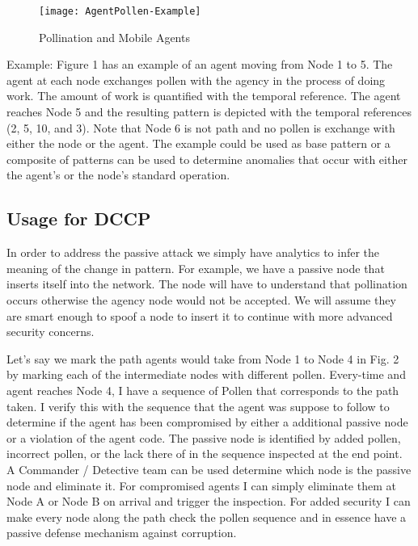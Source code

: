 \documentclass{acm_proc_article-sp}
\begin{document}
\begin{figure}
\centering
\texttt{[image: AgentPollen-Example]}
\caption{Pollination and Mobile Agents}
\end{figure}

Example: Figure 1 has an example of an agent moving from Node 1 to 5. The agent at each node exchanges pollen with the agency in the process of doing work. The amount of work is quantified with the temporal reference. The agent reaches Node 5 and the resulting pattern is depicted with the temporal references (2, 5, 10, and 3). Note that Node 6 is not path and no pollen is exchange with either the node or the agent. The example could be used as base pattern or a composite of patterns can be used to determine anomalies that occur with either the agent's or the node's standard operation.  

\subsection{Usage for DCCP}
In order to address the passive attack we simply have analytics to infer the meaning of the change in pattern. For example, we have a passive node that inserts itself into the network. The node will have to understand that pollination occurs otherwise the agency node would not be accepted. We will assume they are smart enough to spoof a node to insert it to continue with more advanced security concerns.  

Let’s say we mark the path agents would take from Node 1 to Node 4 in Fig. 2 by marking each of the intermediate nodes with different pollen.  Every-time and agent reaches Node 4, I have a sequence of Pollen that corresponds to the path taken. I verify this with the sequence that the agent was suppose to follow to determine if the agent has been compromised by either a additional passive node or a violation of the agent code. The passive node is identified by added pollen, incorrect pollen, or the lack there of in the sequence inspected at the end point. A Commander / Detective team can be used determine which node is the passive node and eliminate it. For compromised agents I can simply eliminate them at Node A or Node B on arrival and trigger the inspection. For added security I can make every node along the path check the pollen sequence and in essence have a passive defense mechanism against corruption.
\end{document}
